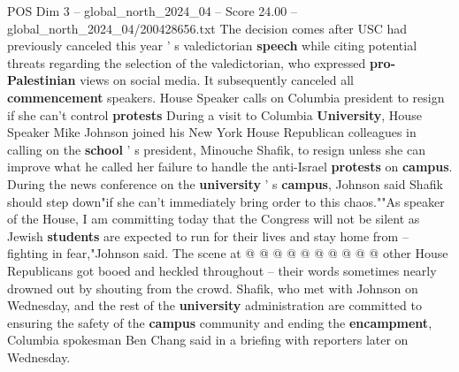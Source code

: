 \begin{textsample}{POS Dim 3 – global\_north\_2024\_04 – Score 24.00 – global\_north\_2024\_04/200428656.txt}
The decision comes after USC had previously canceled this year ' s valedictorian \textbf{speech} while citing potential threats regarding the selection of the valedictorian, who expressed \textbf{pro-Palestinian} views on social media.
It subsequently canceled all \textbf{commencement} speakers.
House Speaker calls on Columbia president to resign if she can't control \textbf{protests} During a visit to Columbia \textbf{University}, House Speaker Mike Johnson joined his New York House Republican colleagues in calling on the \textbf{school} ' s president, Minouche Shafik, to resign unless she can improve what he called her failure to handle the anti-Israel \textbf{protests} on \textbf{campus}.
During the news conference on the \textbf{university} ' s \textbf{campus}, Johnson said Shafik should step down"if she can't immediately bring order to this chaos.""As speaker of the House, I am committing today that the Congress will not be silent as Jewish \textbf{students} are expected to run for their lives and stay home from -- fighting in fear,"Johnson said.
The scene at @ @ @ @ @ @ @ @ @ @ other House Republicans got booed and heckled throughout -- their words sometimes nearly drowned out by shouting from the crowd.
Shafik, who met with Johnson on Wednesday, and the rest of the \textbf{university} administration are committed to ensuring the safety of the \textbf{campus} community and ending the \textbf{encampment}, Columbia spokesman Ben Chang said in a briefing with reporters later on Wednesday.

\end{textsample}

